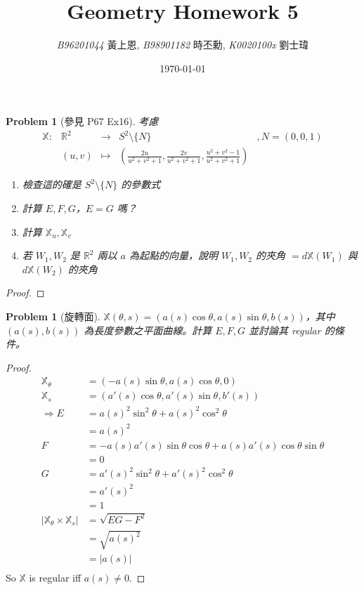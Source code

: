 \documentclass[10pt,a4paper]{article}
\newcommand{\LiHei}{\CJKfamily{lh}}
\newcounter{theProblemCounter}
\newtheorem{problem}[theProblemCounter]{Problem}
\begin{document}
\title{{Geometry Homework 5}}
\author{{\it{B96201044}} {\LiHei 黃上恩}, {\it{B98901182}} {\LiHei 時丕勳}, {\it{K0020100x}} {\LiHei 劉士瑋}}
\date{\today}
\maketitle

\newcommand{\bx}{\mathbb{X}}
\setcounter{theProblemCounter}{0}
\begin{problem}[參見 P67 Ex16]
考慮
\[
\begin{array}{ccccc}
\bx: & \mathbb{R}^2 & \to & S^2\setminus \{N\} & , N=(0,0,1) \\
& (u, v) & \mapsto & \left(\frac{2u}{u^2+v^2+1}, \frac{2v}{u^2+v^2+1},\frac{u^2+v^2-1}{u^2+v^2+1}\right) &
\end{array}
\]

\begin{enumerate}
\item[(a)] 檢查這的確是 $S^2\setminus \{N\}$ 的參數式
\item[(b)] 計算 $E, F, G$，$E=G$ 嗎？
\item[(c)] 計算 $\bx_u, \bx_v$
\item[(d)] 若 $W_1, W_2$ 是 $\mathbb{R}^2$ 兩以 $a$ 為起點的向量，說明 $W_1, W_2$ 的夾角 $=d\bx(W_1)$ 與 $d\bx(W_2)$ 的夾角
\end{enumerate}
\end{problem}
\begin{proof}
\end{proof}

\setcounter{theProblemCounter}{1}
\begin{problem}[旋轉面]
$\bx(\theta, s)=(a(s)\cos\theta, a(s)\sin\theta, b(s))$，其中 $(a(s), b(s))$ 為長度參數之平面曲線。計算 $E, F, G$ 並討論其 regular 的條件。
\end{problem}
\begin{proof}
\begin{align*}
\bx_{\theta}&=(-a(s)\sin\theta, a(s)\cos\theta,0)\\
\bx_{s}&=(a'(s)\cos\theta, a'(s)\sin\theta, b'(s))\\
\Rightarrow E&=a(s)^2\sin^2\theta+a(s)^2\cos^2\theta\\
&=a(s)^2\\
F&=-a(s)a'(s)\sin\theta\cos\theta+a(s)a'(s)\cos\theta\sin\theta\\
&=0\\
G&=a'(s)^2\sin^2\theta+a'(s)^2\cos^2\theta\\
&=a'(s)^2\\
&=1\\
\left|\bx_{\theta}\times\bx_{s}\right|&=\sqrt{EG-F^2}\\
&=\sqrt{a(s)^2}\\
&=\left|a(s)\right|\\
\end{align*}
So $\bx$ is regular iff $a(s)\neq 0$.
\end{proof}
\end{document}
